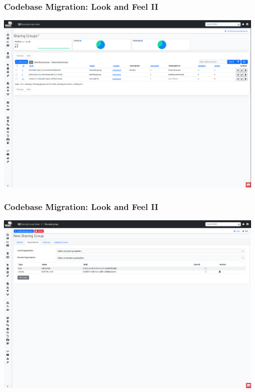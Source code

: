 \begin{frame}
    \frametitle{Codebase Migration: Look and Feel II}
    \begin{center}
        \includegraphics[width=1.0\linewidth]{pictures/sharinggroup-index.png}
    \end{center}
\end{frame}

\begin{frame}
    \frametitle{Codebase Migration: Look and Feel II}
    \begin{center}
        \includegraphics[width=1.0\linewidth]{pictures/sharinggroup-add.png}
    \end{center}
\end{frame}

